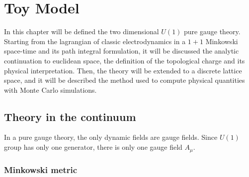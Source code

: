 \chapter{Toy Model}\label{ch:toy_model}

In this chapter will be defined the two dimensional $U(1)$ pure gauge theory.
Starting from the lagrangian of classic electrodynamics in a $1+1$ Minkowski space-time and its path integral formulation,
it will be discussed the analytic continuation to euclidean space, the definition of the topological charge and its physical interpretation.
Then, the theory will be extended to a discrete lattice space, and it will be described the method used to compute physical quantities with Monte Carlo simulations.

%
%
%


\section{Theory in the continuum}

In a pure gauge theory, the only dynamic fields are gauge fields.
Since $U(1)$ group has only one generator, there is only one gauge field $A_\mu$.

\subsection*{Minkowski metric}

